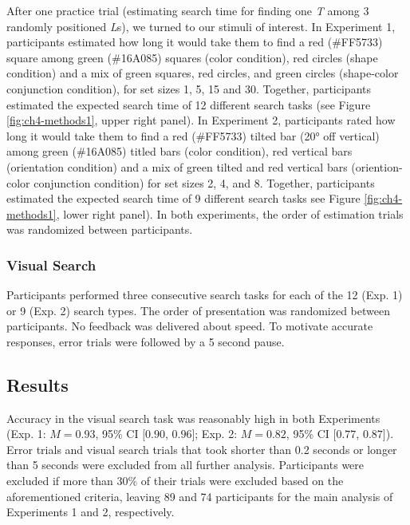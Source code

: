 \documentclass[12pt,twoside]{reedthesis}
\begin{document}
After one practice trial (estimating search time for finding one \emph{T} among 3 randomly positioned \emph{L}s), we turned to our stimuli of interest. In Experiment 1, participants estimated how long it would take them to find a red (\#FF5733) square among green (\#16A085) squares (color condition), red circles (shape condition) and a mix of green squares, red circles, and green circles (shape-color conjunction condition), for set sizes 1, 5, 15 and 30. Together, participants estimated the expected search time of 12 different search tasks (see Figure \ref{fig:ch4-methods1}, upper right panel). In Experiment 2, participants rated how long it would take them to find a red (\#FF5733) tilted bar (20° off vertical) among green (\#16A085) titled bars (color condition), red vertical bars (orientation condition) and a mix of green tilted and red vertical bars (oriention-color conjunction condition) for set sizes 2, 4, and 8. Together, participants estimated the expected search time of 9 different search tasks see Figure \ref{fig:ch4-methods1}, lower right panel). In both experiments, the order of estimation trials was randomized between participants.

\hypertarget{visual-search}{%
\subsubsection*{Visual Search}\label{visual-search}}

Participants performed three consecutive search tasks for each of the 12 (Exp. 1) or 9 (Exp. 2) search types. The order of presentation was randomized between participants. No feedback was delivered about speed. To motivate accurate responses, error trials were followed by a 5 second pause.

\hypertarget{results-2}{%
\subsection{Results}\label{results-2}}

Accuracy in the visual search task was reasonably high in both Experiments (Exp. 1: \(M = 0.93\), 95\% CI \([0.90\), \(0.96]\); Exp. 2: \(M = 0.82\), 95\% CI \([0.77\), \(0.87]\)). Error trials and visual search trials that took shorter than 0.2 seconds or longer than 5 seconds were excluded from all further analysis. Participants were excluded if more than 30\% of their trials were excluded based on the aforementioned criteria, leaving 89 and 74 participants for the main analysis of Experiments 1 and 2, respectively.
\end{document}
